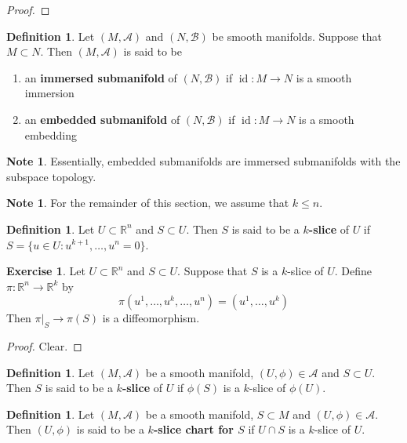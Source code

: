 \documentclass{book}
\theoremstyle{definition}
\newtheorem{defn}[definition]{Definition}
\newtheorem{note}[definition]{Note}
\newtheorem{ex}[definition]{Exercise}
\newcommand{\R}{\mathbb{R}}
\newcommand{\MA}{\mathcal{A}}
\newcommand{\MB}{\mathcal{B}}
\DeclareMathOperator{\id}{id}
\DeclareMathOperator*{\0}{\mbf{0}}
\DeclareMathOperator*{\1}{\mbf{1}}
\begin{document}
	\begin{proof}
	
	\end{proof}
	
	
	
	\newpage

	\begin{defn}
		Let $(M, \MA)$ and  $(N, \MB)$ be smooth manifolds. Suppose that $M \subset N$. Then $(M, \MA)$ is said to be 
		\begin{enumerate}
		\item an \textbf{immersed submanifold} of $(N, \MB)$ if $\id:M \rightarrow N$ is a smooth immersion
		\item an \textbf{embedded submanifold} of $(N, \MB)$ if $\id:M \rightarrow N$ is a smooth embedding
		\end{enumerate}
	\end{defn}
	
	\begin{note}
	Essentially, embedded submanifolds are immersed submanifolds with the subspace topology.
	\end{note}
	
	\begin{note}
	For the remainder of this section, we assume that $k \leq n$.
	\end{note}
	
	\begin{defn}
	Let $U \subset \R^n$ and $S \subset U$. Then $S$ is said to be a \textbf{$k$-slice} of $U$ if $S = \{u \in U: u^{k+1}, \dots, u^{n} = 0\}$.
	\end{defn}	
	
	\begin{ex}
	Let $U \subset \R^n$ and $S \subset U$. Suppose that $S$ is a $k$-slice of $U$. Define $\pi: \R^n \rightarrow \R^k$ by $$\pi(u^1, \dots, u^k, \dots, u^n) = (u^1, \dots, u^k)$$ Then $\pi|_{S} \rightarrow \pi(S)$ is a diffeomorphism.
	\end{ex}	
	
	\begin{proof}
	Clear.
	\end{proof}
	
	\begin{defn}
	Let $(M, \MA)$ be a smooth manifold, $(U, \phi) \in \MA$ and $S \subset U$. Then $S$ is said to be a \textbf{$k$-slice} of $U$ if $\phi(S)$ is a $k$-slice of $\phi(U)$.
	\end{defn}	
	
	\begin{defn}
	Let $(M, \MA)$ be a smooth manifold, $S \subset M$ and $(U, \phi) \in \MA$. Then $(U, \phi)$ is said to be a \textbf{$k$-slice chart for $S$} if $U \cap S$ is a $k$-slice of $U$.
	\end{defn}	
	
\end{document}
